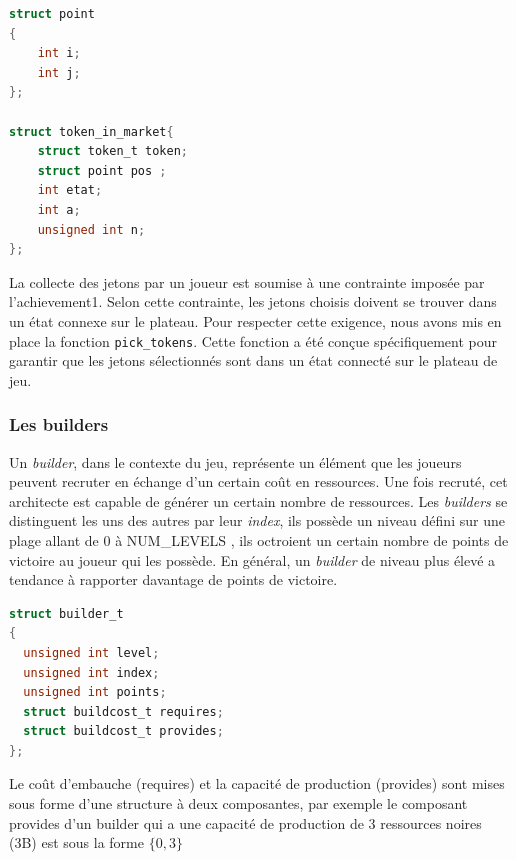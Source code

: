 \documentclass{article}
\begin{document}
\begin{tcolorbox}[colback=gray!10,colframe=white!75!black]

\begin{lstlisting}[language=C, caption={la structure token\_in\_market}, label={lst:exemple7-c}]
struct point
{
    int i;
    int j;
};

struct token_in_market{
    struct token_t token;
    struct point pos ;
    int etat;                            
    int a;                        
    unsigned int n;             
};
\end{lstlisting}
\end{tcolorbox}
\vspace{2em}
\hspace{1.5em}La collecte des jetons par un joueur est soumise à une contrainte imposée par l'achievement1. Selon cette contrainte, les jetons choisis doivent se trouver dans un état connexe sur le plateau. Pour respecter cette exigence, nous avons mis en place la fonction \texttt{pick\_tokens}. Cette fonction a été conçue spécifiquement pour garantir que les jetons sélectionnés sont dans un état connecté sur le plateau de jeu.



\subsubsection{Les builders}



    Un \emph{builder}, dans le contexte du jeu, représente un élément que les joueurs peuvent recruter en échange d'un certain coût en ressources. Une fois recruté, cet architecte est capable de générer un certain nombre de ressources. Les \emph{builders} se distinguent les uns des autres par leur \emph{index}, ils possède un niveau défini sur une plage allant de 0 à NUM\_LEVELS , ils octroient un certain nombre de points de victoire au joueur qui les possède. En général, un \emph{builder} de niveau plus élevé a tendance à rapporter davantage de points de victoire.

    
   
\begin{tcolorbox}[colback=gray!10,colframe=white!75!black]

\begin{lstlisting}[language=C, caption={La structure caracterisant un Builder}, 
label={lst:exemple2-c}]
struct builder_t
{
  unsigned int level;
  unsigned int index;
  unsigned int points;
  struct buildcost_t requires;
  struct buildcost_t provides;
};
\end{lstlisting}
\end{tcolorbox}
\vspace{10pt}
Le  coût d'embauche (requires) et la  capacité de production (provides) sont mises sous forme d'une structure à deux composantes,
par exemple le composant provides d'un builder qui a une capacité de production de 3 ressources noires (3B) est sous la forme \(\{0,3\}\)
    
\end{document}
